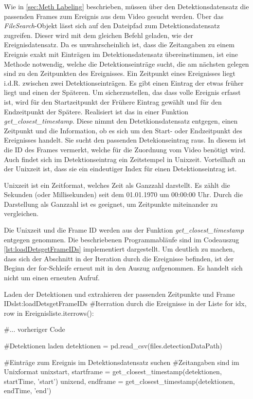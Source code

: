 Wie in \ref{sec:Meth Labeling} beschrieben, müssen über den Detektionsdatensatz die passenden Frames zum Ereignis aus dem Video gesucht werden. Über das \textit{FileSearch}-Objekt lässt sich auf den Dateipfad zum Detektionsdatensatz zugreifen. Dieser wird mit dem gleichen Befehl geladen, wie der Ereignisdatensatz. Da es unwahrscheinlich ist, dass die Zeitangaben zu einem Ereignis exakt mit Einträgen im Detektionsdatensatz übereinstimmen, ist eine Methode notwendig, welche die Detektionseinträge sucht, die am nächsten gelegen sind zu den Zeitpunkten des Ereignisses. Ein Zeitpunkt eines Ereignisses liegt i.d.R. zwischen zwei Detektionseinträgen. Es gibt einen Eintrag der etwas früher liegt und einen der Späteren. Um sicherzustellen, das dass volle Ereignis erfasst ist, wird für den Startzeitpunkt der Frühere Eintrag gewählt und für den Endzeitpunkt der Spätere. Realisiert ist das in einer Funktion \textit{get\_closest\_timestamp}. Diese nimmt den Detetkionsdatensatz entgegen, einen Zeitpunkt und die Information, ob es sich um den Start- oder Endzeitpunkt des Ereignisses handelt. Sie sucht den passenden Detekionseintrag raus. In diesem ist die ID des Frames vermerkt, welche für die Zuordnung vom Video benötigt wird. Auch findet sich im Detektionseintrag ein Zeitstempel in Unixzeit. Vorteilhaft an der Unixzeit ist, dass sie ein eindeutiger Index für einen Detektionseintrag ist. \par

Unixzeit ist ein Zeitformat, welches Zeit als Ganzzahl darstellt. Es zählt die Sekunden (oder Millisekunden) seit dem 01.01.1970 um 00:00:00 Uhr. Durch die Darstellung als Ganzzahl ist es geeignet, um Zeitpunkte miteinander zu vergleichen.  \par

Die Unixzeit und die Frame ID werden aus der Funktion \textit{get\_closest\_timestamp} entgegen genommen. Die beschriebenen Programmabläufe sind im Codeauszug \ref{lst:loadDetsgetFrameIDs} implementiert dargestellt. Um deutlich zu machen, dass sich der Abschnitt in der Iteration durch die Ereignisse befinden, ist der Beginn der for-Schleife erneut mit in den Auszug aufgenommen. Es handelt sich nicht um einen erneuten Aufruf.

\begin{pythoncode}{Laden der Detektionen und extrahieren der passenden Zeitpunkte und Frame IDs}{lst:loadDetsgetFrameIDs}
#Iterration durch die Ereignisse in der Liste
for idx, row in Ereignisliste.iterrows():  

    #... vorheriger Code

    #Detektionen laden
    detektionen = pd.read_csv(files.detectionDataPath)

    #Einträge zum Ereignis im Detektionsdatensatz suchen
    #Zeitangaben sind im Unixformat
    unixstart, startframe = get_closest_timestamp(detektionen, startTime, 'start') 
    unixend, endframe = get_closest_timestamp(detektionen, endTime, 'end')
\end{pythoncode}

